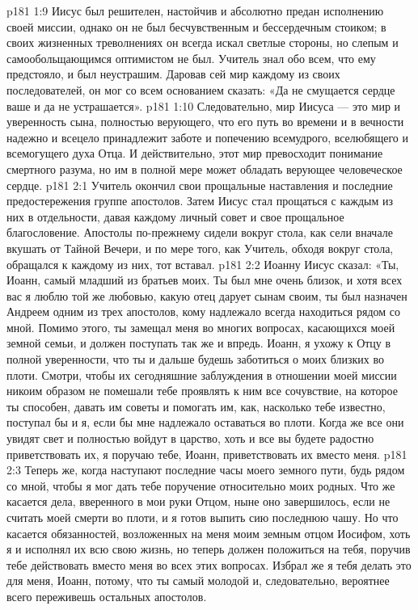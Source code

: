 \vs p181 1:9 Иисус был решителен, настойчив и абсолютно предан исполнению своей миссии, однако он не был бесчувственным и бессердечным стоиком; в своих жизненных треволнениях он всегда искал светлые стороны, но слепым и самообольщающимся оптимистом не был. Учитель знал обо всем, что ему предстояло, и был неустрашим. Даровав сей мир каждому из своих последователей, он мог со всем основанием сказать: «Да не смущается сердце ваше и да не устрашается».
\vs p181 1:10 Следовательно, мир Иисуса --- это мир и уверенность сына, полностью верующего, что его путь во времени и в вечности надежно и всецело принадлежит заботе и попечению всемудрого, вселюбящего и всемогущего духа Отца. И действительно, этот мир превосходит понимание смертного разума, но им в полной мере может обладать верующее человеческое сердце.
\vs p181 2:1 Учитель окончил свои прощальные наставления и последние предостережения группе апостолов. Затем Иисус стал прощаться с каждым из них в отдельности, давая каждому личный совет и свое прощальное благословение. Апостолы по\hyp{}прежнему сидели вокруг стола, как сели вначале вкушать от Тайной Вечери, и по мере того, как Учитель, обходя вокруг стола, обращался к каждому из них, тот вставал.
\vs p181 2:2 \pc Иоанну Иисус сказал: «Ты, Иоанн, самый младший из братьев моих. Ты был мне очень близок, и хотя всех вас я люблю той же любовью, какую отец дарует сынам своим, ты был назначен Андреем одним из трех апостолов, кому надлежало всегда находиться рядом со мной. Помимо этого, ты замещал меня во многих вопросах, касающихся моей земной семьи, и должен поступать так же и впредь. Иоанн, я ухожу к Отцу в полной уверенности, что ты и дальше будешь заботиться о моих близких во плоти. Смотри, чтобы их сегодняшние заблуждения в отношении моей миссии никоим образом не помешали тебе проявлять к ним все сочувствие, на которое ты способен, давать им советы и помогать им, как, насколько тебе известно, поступал бы и я, если бы мне надлежало оставаться во плоти. Когда же все они увидят свет и полностью войдут в царство, хоть и все вы будете радостно приветствовать их, я поручаю тебе, Иоанн, приветствовать их вместо меня.
\vs p181 2:3 Теперь же, когда наступают последние часы моего земного пути, будь рядом со мной, чтобы я мог дать тебе поручение относительно моих родных. Что же касается дела, вверенного в мои руки Отцом, ныне оно завершилось, если не считать моей смерти во плоти, и я готов выпить сию последнюю чашу. Но что касается обязанностей, возложенных на меня моим земным отцом Иосифом, хоть я и исполнял их всю свою жизнь, но теперь должен положиться на тебя, поручив тебе действовать вместо меня во всех этих вопросах. Избрал же я тебя делать это для меня, Иоанн, потому, что ты самый молодой и, следовательно, вероятнее всего переживешь остальных апостолов.
